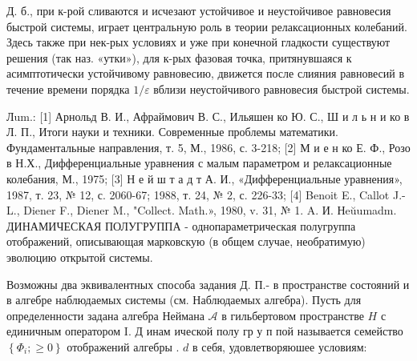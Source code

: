 \documentclass[10pt]{article}
\begin{document}
Д. б., при к-рой сливаются и исчезают устойчивое и неустойчивое равновесия быстрой системы, играет центральную роль в теории релаксационных колебаний. Здесь также при нек-рых условиях и уже при конечной гладкости существуют решения (так наз. «утки»), для к-рых фазовая точка, притянувшаяся к асимптотически устойчивому равновесию, движется после слияния равновесий в течение времени порядка $1 / \varepsilon$ вблизи неустойчивого равновесия быстрой системы.



Лum.: [1] Арнольд В. И., Афраймович В. С., Ильяшен ко Ю. С., Ш и л ь н и ко в Л. П., Итоги науки и техники. Современные проблемы математики. Фундаментальные направления, т. 5, М., 1986, с. 3-218; [2] М и е н ко Е. Ф., Розо в Н.Х., Дифференциальные уравнения с малым параметром и релаксационные колебания, М., 1975; [3] Н е й ш т а д т А. И., «Дифференциальные уравнения», 1987, т. 23, № 12, с. 2060-67; 1988, т. 24, № 2, с. 226-33; [4] Benoit E., Callot J.-L., Diener F., Diener M., "Collect. Math.», 1980, v. 31, № 1. A. И. Нeŭumadm. ДИНАМИЧЕСКАЯ ПОЛУГРУППА - однопараметрическая полугруппа отображений, описывающая марковскую (в общем случае, необратимую) эволюцию открытой системы.



Возможны два эквивалентных способа задания Д. П.- в пространстве состояний и в алгебре наблюдаемых системы (см. Наблюдаемых алгебра). Пусть для определенности задана алгебра Неймана $\mathscr{A}$ в гильбертовом пространстве $H$ с единичным оператором I. Д инам ической полу гр у п пой называется семейство $\left\{\Phi_{i} ; \geqslant 0\right\}$ отображений алгебры . $d$ в себя, удовлетворяюшее условиям:
\end{document}
